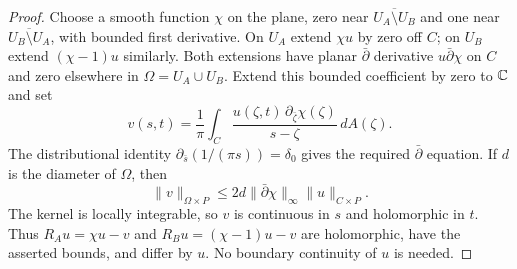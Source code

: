 \begin{proof}
Choose a smooth function $\chi$ on the plane, zero near
$\overline{U_A\setminus U_B}$ and one near
$\overline{U_B\setminus U_A}$, with bounded first derivative.
On $U_A$ extend $\chi u$ by zero off $C$; on $U_B$ extend
$(\chi-1)u$ similarly. Both extensions have planar
$\bar\partial$ derivative $u\bar\partial\chi$ on $C$ and zero
elsewhere in $\Omega=U_A\cup U_B$.
Extend this bounded coefficient by zero to $\mathbb C$ and set
\[
v(s,t)=\frac1\pi\int_C
 \frac{u(\zeta,t)\,\partial_{\bar\zeta}\chi(\zeta)}
      {s-\zeta}\,dA(\zeta).
\]
The distributional identity
$\partial_{\bar s}(1/(\pi s))=\delta_0$ gives the required
$\bar\partial$ equation. If $d$ is the diameter of $\Omega$, then
\[
\|v\|_{\Omega\times P}
\le 2d\|\bar\partial\chi\|_\infty\|u\|_{C\times P}.
\]
The kernel is locally integrable, so $v$ is continuous in $s$
and holomorphic in $t$. Thus
$R_Au=\chi u-v$ and $R_Bu=(\chi-1)u-v$ are holomorphic, have
the asserted bounds, and differ by $u$. No boundary continuity
of $u$ is needed.
\end{proof}

